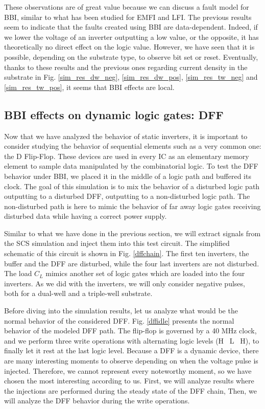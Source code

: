 	These observations are of great value because we can discuss a fault model for BBI, similar to what has been studied for EMFI and LFI.
	The previous results seem to indicate that the faults created using BBI are data-dependent.
	Indeed, if we lower the voltage of an inverter outputting a low value, or the opposite, it has theoretically no direct effect on the logic value.
	However, we have seen that it is possible, depending on the substrate type, to observe bit set or reset.
	Eventually, thanks to these results and the previous ones regarding current density in the substrate in Fig. \ref{sim_res_dw_neg}, \ref{sim_res_dw_pos}, \ref{sim_res_tw_neg} and \ref{sim_res_tw_pos}, it seems that BBI effects are local.

\subsection{BBI effects on dynamic logic gates: DFF}
	
	Now that we have analyzed the behavior of static inverters, it is important to consider studying the behavior of sequential elements such as a very common one: the D Flip-Flop.
	These devices are used in every IC as an elementary memory element to sample data manipulated by the combinatorial logic.
	To test the DFF behavior under BBI, we placed it in the middle of a logic path and buffered its clock.
	The goal of this simulation is to mix the behavior of a disturbed logic path outputting to a disturbed DFF, outputting to a non-disturbed logic path.
	The non-disturbed path is here to mimic the behavior of far away logic gates receiving disturbed data while having a correct power supply.
	
	Similar to what we have done in the previous section, we will extract signals from the SCS simulation and inject them into this test circuit.
	The simplified schematic of this circuit is shown in Fig. \ref{dffchain}.
	The first ten inverters, the buffer and the DFF are disturbed, while the four last inverters are not disturbed.
	The load $C_L$ mimics another set of logic gates which are loaded into the four inverters.
	As we did with the inverters, we will only consider negative pulses, both for a dual-well and a triple-well substrate.
	
	Before diving into the simulation results, let us analyze what would be the normal behavior of the considered DFF.
	Fig. \ref{dffidle} presents the normal behavior of the modeled DFF path.
	The flip-flop is governed by a 40 MHz clock, and we perform three write operations with alternating logic levels (H \textrightarrow\ L \textrightarrow\ H), to finally let it rest at the last logic level.
	Because a DFF is a dynamic device, there are many interesting moments to observe depending on when the voltage pulse is injected.
	Therefore, we cannot represent every noteworthy moment, so we have chosen the most interesting according to us.
	First, we will analyze results where the injections are performed during the steady state of the DFF chain,
	Then, we will analyze the DFF behavior during the write operations.
	
